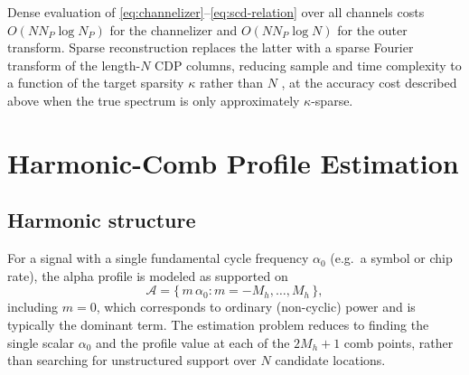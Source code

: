 \documentclass[10pt,twocolumn]{article}
\begin{document}
Dense evaluation of \eqref{eq:channelizer}--\eqref{eq:scd-relation} over
all channels costs $O(N N_P \log N_P)$ for the channelizer and
$O(N N_P \log N)$ for the outer transform. Sparse reconstruction replaces
the latter with a sparse Fourier transform of the length-$N$ CDP columns,
reducing sample and time complexity to a function of the target sparsity
$\kappa$ rather than $N$ \cite{s3ca2015}, at the accuracy cost described
above when the true spectrum is only approximately $\kappa$-sparse.

\section{Harmonic-Comb Profile Estimation}

\subsection{Harmonic structure}
For a signal with a single fundamental cycle frequency $\alpha_0$ (e.g.\ a
symbol or chip rate), the alpha profile is modeled as supported on
\begin{equation}
\mathcal{A} = \{\, m\,\alpha_0 : m = -M_h, \dots, M_h \,\},
\label{eq:comb}
\end{equation}
including $m=0$, which corresponds to ordinary (non-cyclic) power and is
typically the dominant term. The estimation problem reduces to finding the
single scalar $\alpha_0$ and the profile value at each of the $2M_h+1$
comb points, rather than searching for unstructured support over $N$
candidate locations.
\end{document}
